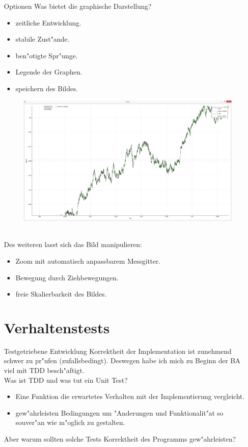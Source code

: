 \documentclass{beamer}
\begin{document}
\begin{frame}{Optionen}
	Was bietet die graphische Darstellung?\smallskip\\
	\begin{minipage}{0.42\textwidth}
	\begin{itemize}
		\item zeitliche Entwicklung.
		\item stabile Zust"ande.
		\item ben"otigte Spr"unge.
		\item Legende der Graphen.
		\item speichern des Bildes.
	\end{itemize}
	\end{minipage}
	\begin{minipage}{0.56\textwidth}
	\begin{figure}[H]
		\centering
		\includegraphics[width=0.9\linewidth]{./Pictures/PlotWindow_zoomedBPDLmaximized}
	\end{figure}
	\end{minipage}\smallskip\\
	Des weiteren lasst sich das Bild manipulieren:
	\begin{itemize}
		\item Zoom mit automatisch anpassbarem Messgitter.
		\item Bewegung durch Ziehbewegungen.
		\item freie Skalierbarkeit des Bildes.
	\end{itemize}
\end{frame}

\section{Verhaltenstests}
\begin{frame}{Testgetriebene Entwicklung}
Korrektheit der Implementation ist zunehmend schwer zu pr"ufen (zufallsbedingt). Deswegen habe ich mich zu Beginn der BA viel mit TDD besch"aftigt.\\\pause
Was ist TDD und was tut ein Unit Test?
\begin{itemize}
	\item Eine Funktion die erwartetes Verhalten mit der Implementierung vergleicht.
	\item gew"ahrleisten Bedingungen um "Anderungen und Funktionalit"at so souver"an wie m"oglich zu gestalten.
\end{itemize}\pause
Aber warum sollten solche Tests Korrektheit des Programms gew"ahrleisten?
\end{frame}
\end{document}
